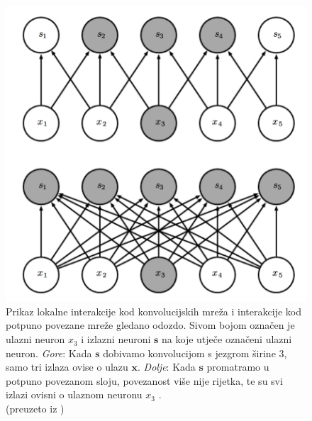 \documentclass[times, utf8, diplomski]{fer}
\theoremstyle{definition}
\begin{document}
\begin{figure}[!htb]
\centering
\includegraphics[scale=0.25]{lokalna_povezanost_odozdo.png}
\caption{Prikaz lokalne interakcije kod konvolucijskih mreža i interakcije kod potpuno povezane mreže gledano odozdo. Sivom bojom označen je ulazni neuron $x_3$ i izlazni neuroni $\bm{s}$ na koje utječe označeni ulazni neuron. \textit{Gore}: Kada $\bm{s}$ dobivamo konvolucijom s jezgrom širine 3, samo tri izlaza ovise o ulazu $\bm{x}$. \textit{Dolje}: Kada $\bm{s}$ promatramo u potpuno povezanom sloju, povezanost više nije rijetka, te su svi izlazi ovisni o ulaznom neuronu $x_3$ . \\ (preuzeto iz \cite{Goodfellow-et-al-2016})}
\end{figure}
\newpage
\end{document}
